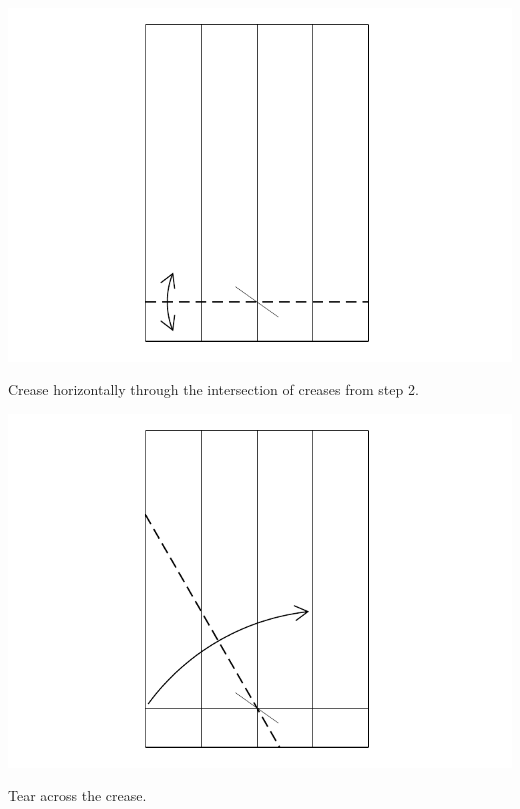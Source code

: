 \documentclass[11pt]{article}
\begin{document}
\begin{minipage}[t]{0.45\textwidth}
  \includegraphics[width=\textwidth]{../figs/fig03b-04}
  \begin{itemize}{\item[4.] Crease horizontally through the intersection of creases from step 2.}\end{itemize}
\end{minipage}
\hfill
\begin{minipage}[t]{0.45\textwidth}
  \includegraphics[width=\textwidth]{../figs/fig03b-05}
  \begin{itemize}{\item[5.] Tear across the crease.}\end{itemize}
\end{minipage}

\vspace*{0.5in}
\end{document}
